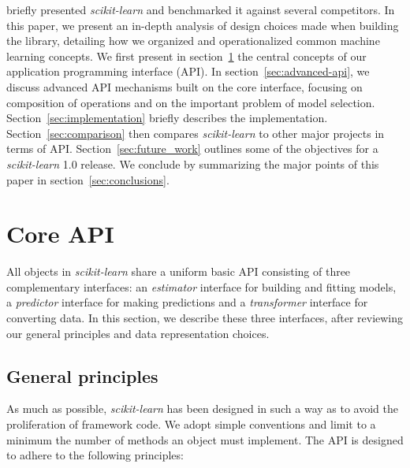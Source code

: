 \documentclass[twocolumn]{article}
\newcommand{\sklearn}{\textit{scikit-learn}\xspace}
\begin{document}
\citet{pedregosa2011} briefly presented \sklearn and
benchmarked it against several competitors.
In this paper, we present an
in-depth analysis of design choices made when building the library,
detailing how we organized and operationalized
common machine learning concepts.
We first present in section~\ref{sec:core-api}
the central concepts of our application programming interface (API).
In section~\ref{sec:advanced-api}, we discuss
advanced API mechanisms built on the core interface,
focusing on composition of operations
and on the important problem of model selection.
Section~\ref{sec:implementation} briefly describes the implementation.
Section~\ref{sec:comparison} then
compares \sklearn to other major projects in terms of API\@.
Section~\ref{sec:future_work} outlines some of the objectives for
a \sklearn 1.0 release.
We conclude by summarizing the major points of this paper in
section~\ref{sec:conclusions}.

\section{Core API}

\label{sec:core-api}

All objects in \sklearn share a uniform basic API consisting of three
complementary interfaces: an \textit{estimator} interface for building and
fitting models, a \textit{predictor} interface for making predictions and a
\textit{transformer} interface for converting data. In this section, we describe
these three interfaces, after reviewing our general principles and data
representation choices.

\subsection{General principles}

As much as possible, \sklearn has been designed in such a way
as to avoid the proliferation of framework code.
We adopt simple conventions and limit to a minimum the number of methods
an object must implement.
The API is designed to adhere to the following principles:
\end{document}

